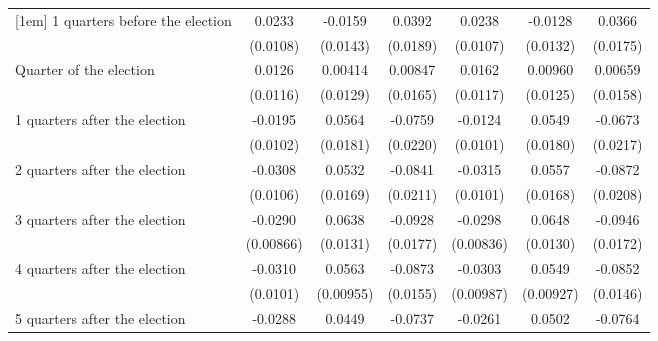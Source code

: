 \begin{table}[!ht]
\begin{tabular}{l*{6}{c}}
[1em]
 1 quarters before the election&      0.0233\sym{*}  &     -0.0159         &      0.0392\sym{*}  &      0.0238\sym{*}  &     -0.0128         &      0.0366\sym{*}  \\
                    &    (0.0108)         &    (0.0143)         &    (0.0189)         &    (0.0107)         &    (0.0132)         &    (0.0175)         \\
[1em]
Quarter of the election&      0.0126         &     0.00414         &     0.00847         &      0.0162         &     0.00960         &     0.00659         \\
                    &    (0.0116)         &    (0.0129)         &    (0.0165)         &    (0.0117)         &    (0.0125)         &    (0.0158)         \\
[1em]
 1 quarters after the election&     -0.0195         &      0.0564\sym{**} &     -0.0759\sym{***}&     -0.0124         &      0.0549\sym{**} &     -0.0673\sym{**} \\
                    &    (0.0102)         &    (0.0181)         &    (0.0220)         &    (0.0101)         &    (0.0180)         &    (0.0217)         \\
[1em]
 2 quarters after the election&     -0.0308\sym{**} &      0.0532\sym{**} &     -0.0841\sym{***}&     -0.0315\sym{**} &      0.0557\sym{***}&     -0.0872\sym{***}\\
                    &    (0.0106)         &    (0.0169)         &    (0.0211)         &    (0.0101)         &    (0.0168)         &    (0.0208)         \\
[1em]
 3 quarters after the election&     -0.0290\sym{***}&      0.0638\sym{***}&     -0.0928\sym{***}&     -0.0298\sym{***}&      0.0648\sym{***}&     -0.0946\sym{***}\\
                    &   (0.00866)         &    (0.0131)         &    (0.0177)         &   (0.00836)         &    (0.0130)         &    (0.0172)         \\
[1em]
 4 quarters after the election&     -0.0310\sym{**} &      0.0563\sym{***}&     -0.0873\sym{***}&     -0.0303\sym{**} &      0.0549\sym{***}&     -0.0852\sym{***}\\
                    &    (0.0101)         &   (0.00955)         &    (0.0155)         &   (0.00987)         &   (0.00927)         &    (0.0146)         \\
[1em]
 5 quarters after the election&     -0.0288\sym{**} &      0.0449\sym{**} &     -0.0737\sym{***}&     -0.0261\sym{*}  &      0.0502\sym{***}&     -0.0764\sym{***}\\

\end{tabular}
\end{table}
